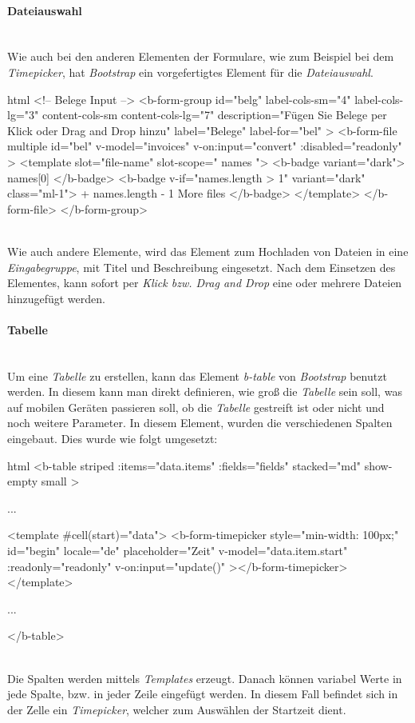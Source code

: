 \paragraph{Dateiauswahl}
~\\
Wie auch bei den anderen Elementen der Formulare, wie zum Beispiel bei dem \textit{Timepicker}, hat \textit{Bootstrap} ein vorgefertigtes Element für die \textit{Dateiauswahl}. 
\begin{code}{html}
	<!-- Belege Input -->
	<b-form-group
	  id="belg"
	  label-cols-sm="4"
	  label-cols-lg="3"
	  content-cols-sm
	  content-cols-lg="7"
	  description="Fügen Sie Belege per Klick oder Drag and Drop hinzu"
	  label="Belege"
	  label-for="bel"
	>
	  <b-form-file
		multiple
		id="bel"
		v-model="invoices"
		v-on:input="convert"
		:disabled="readonly"
	  >
		<template slot="file-name" slot-scope="{ names }">
		  <b-badge variant="dark">{{ names[0] }}</b-badge>
		  <b-badge v-if="names.length > 1" variant="dark" class="ml-1">
			+ {{ names.length - 1 }} More files
		  </b-badge>
		</template>
	  </b-form-file>
	</b-form-group>
\end{code}
	\label{list:dateiselect} ~\\
Wie auch andere Elemente, wird das Element zum Hochladen von Dateien in eine \textit{Eingabegruppe}, mit Titel und Beschreibung eingesetzt. Nach dem Einsetzen des Elementes, kann sofort per \textit{Klick bzw. Drag and Drop} eine oder mehrere Dateien hinzugefügt werden.
\newpage
\paragraph{Tabelle}~\\
Um eine \textit{Tabelle} zu erstellen, kann das Element \textit{b-table} von \textit{Bootstrap} benutzt werden. In diesem kann man direkt definieren, wie groß die \textit{Tabelle} sein soll, was auf mobilen Geräten passieren soll, ob die \textit{Tabelle} gestreift ist oder nicht und noch weitere Parameter. In diesem Element, wurden die verschiedenen Spalten eingebaut. Dies wurde wie folgt umgesetzt:
\begin{code}{html}
	<b-table
          striped
          :items="data.items"
          :fields="fields"
          stacked="md"
          show-empty
          small
    >

		...

		<template #cell(start)="data">
			<b-form-timepicker
				style="min-width: 100px;"
				id="begin"
				locale="de"
				placeholder="Zeit"
				v-model="data.item.start"
				:readonly="readonly"
				v-on:input="update()"
			></b-form-timepicker>
		</template>

		...

	</b-table>
\end{code}
	\label{list:bsptable} ~\\
Die Spalten werden mittels \textit{Templates} erzeugt. Danach können variabel Werte in jede Spalte, bzw. in jeder Zeile eingefügt werden. In diesem Fall befindet sich in der Zelle ein \textit{Timepicker}, welcher zum Auswählen der Startzeit dient.
\newpage
